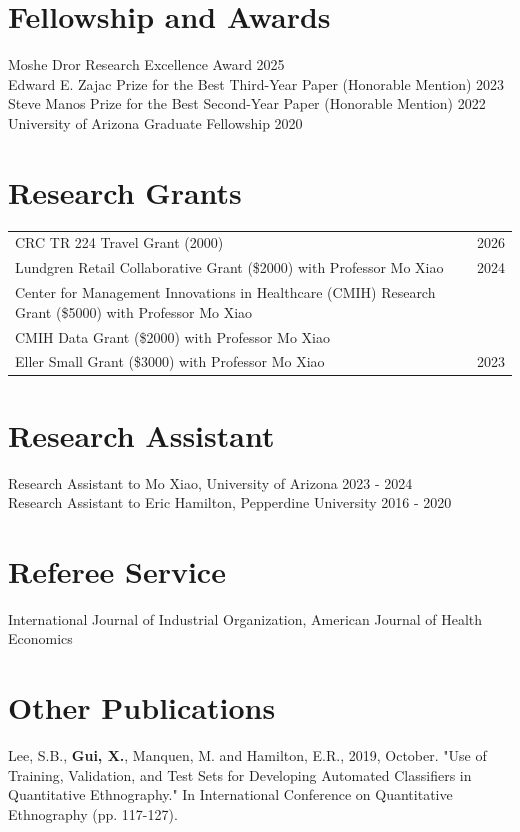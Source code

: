 \documentclass[margin,line]{res}
\begin{document}
\begin{resume}
\section{\sc Fellowship and Awards} 
Moshe Dror Research Excellence Award \hfill 2025 \\ 
Edward E. Zajac Prize for the Best Third-Year Paper (Honorable Mention) \hfill 2023 \\
Steve Manos Prize for the Best Second-Year Paper (Honorable Mention) \hfill 2022 \\ 
University of Arizona Graduate Fellowship \hfill 2020


\section{\sc Research Grants} 

\begin{tabular}{@{}p{5.6in}p{1in}}
        CRC TR 224 Travel Grant (\texteuro{}2000) & 2026 \\
        Lundgren Retail Collaborative Grant (\$2000) with Professor Mo Xiao & 2024 \\
        Center for Management Innovations in Healthcare (CMIH) Research Grant (\$5000) with Professor Mo Xiao &  \\
        CMIH Data Grant (\$2000) with Professor Mo Xiao & \\ 
        Eller Small Grant (\$3000) with Professor Mo Xiao & 2023 \\
\end{tabular}

\section{\sc Research Assistant} Research Assistant to Mo Xiao, University of Arizona \hfill 2023 - 2024 \\
Research Assistant to Eric Hamilton, Pepperdine University \hfill 2016 - 2020

\section{\sc Referee Service} International Journal of Industrial Organization, American Journal of Health Economics

\section{\sc Other Publications} Lee, S.B., \textbf{Gui, X.}, Manquen, M. and Hamilton, E.R., 2019, October. "Use of Training, Validation, and Test Sets for Developing Automated Classifiers in Quantitative Ethnography." In International Conference on Quantitative Ethnography (pp. 117-127).


\end{resume}
\end{document}
